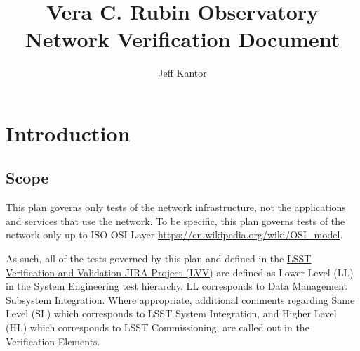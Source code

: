 \documentclass[DM,lsstdraft,STS,toc]{lsstdoc}
\begin{document}
\providecommand{\tightlist}{%
  \setlength{\itemsep}{0pt}\setlength{\parskip}{0pt}}

\def\product{LSST Data Management}


\title[Network Verification Document]{Vera C. Rubin Observatory Network Verification Document}

\author{Jeff Kantor}
\setDocRef{\lsstDocType-\lsstDocNum}
\setDocDate{\vcsdate}



\setDocUpstreamVersion{\vcsrevision}

\maketitle


\section{Introduction}\label{sec:intro}


\subsection{Scope}\label{sec:scope}

This plan governs only tests of the network infrastructure, not the applications and services that
use the network. To be specific, this plan governs tests of the network only up to ISO OSI Layer
\url{https://en.wikipedia.org/wiki/OSI_model}.

As such, all of the tests governed by this plan and defined in the 
\href{https://jira.lsstcorp.org/projects/LVV/}{LSST Verification and Validation JIRA Project (LVV)} 
are defined as Lower Level (LL) in the System Engineering test hierarchy. LL
corresponds to Data Management Subsystem Integration. Where appropriate, additional
comments regarding Same Level (SL) which corresponds to LSST System Integration, and Higher
Level (HL) which corresponds to LSST Commissioning, are called out in the Verification
Elements.
\end{document}
